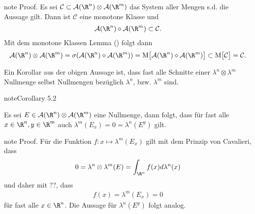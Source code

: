\documentclass[letterpaper,10pt,german]{jupyterBook}
\begin{document}
\begin{sphinxadmonition}{note}
\sphinxAtStartPar
Proof. Es sei \(\mathcal{C}\subset\mathcal{A}(\R^n)\otimes\mathcal{A}(\R^m)\) das System aller Mengen s.d. die Aussage gilt. Dann ist \(\mathcal{C}\) eine monotone Klasse und
\begin{equation*}
\begin{split}\mathcal{A}(\R^n)\diamond\mathcal{A}(\R^m)\subset \mathcal{C}.\end{split}
\end{equation*}
\sphinxAtStartPar
Mit dem monotone Klassen Lemma ({\hyperref[\detokenize{masstheorie/integrationstechnik:lem:monclass}]{}}) folgt dann
\begin{equation*}
\begin{split}\mathcal{A}(\R^n)\otimes\mathcal{A}(\R^m) = \sigma(\mathcal{A}(\R^n)\diamond\mathcal{A}(\R^m)) = 
\text{M}\big[\mathcal{A}(\R^n)\diamond\mathcal{A}(\R^m)\big] \subset 
\text{M}\big[\mathcal{C}\big] = \mathcal{C}.\end{split}
\end{equation*}\end{sphinxadmonition}

\sphinxAtStartPar
Ein Korollar aus der obigen Aussage ist, dass fast alle Schnitte einer \(\lambda^n\otimes\lambda^m\) Nullmenge selbst Nullmengen bezüglich \(\lambda^n\), bzw. \(\lambda^m\) sind.
\label{masstheorie/integrationstechnik:cor:zeroprodset}
\begin{sphinxadmonition}{note}{Corollary 5.2}



\sphinxAtStartPar
Es sei \(E\in\mathcal{A}(\R^n)\otimes\mathcal{A}(\R^m)\) eine Nullmenge, dann folgt, dass für fast alle \(x\in\R^n,y\in\R^m\) auch \(\lambda^m(E_x)=0=\lambda^n(E^y)\) gilt.
\end{sphinxadmonition}

\begin{sphinxadmonition}{note}
\sphinxAtStartPar
Proof. Für die Funktion \(f:x\mapsto \lambda^m(E_x)\) gilt mit dem Prinzip von Cavalieri, dass
\begin{equation*}
\begin{split}0 = \lambda^{n}\otimes\lambda^{m}(E) = \int_{\R^n} f(x)d\lambda^n(x)\end{split}
\end{equation*}
\sphinxAtStartPar
und daher mit ??, dass
\begin{equation*}
\begin{split}f(x)=\lambda^m(E_x)=0\end{split}
\end{equation*}
\sphinxAtStartPar
für fast alle \(x\in\R^n\). Die Aussage für \(\lambda^n(E^y)\) folgt analog.
\end{sphinxadmonition}
\end{document}
